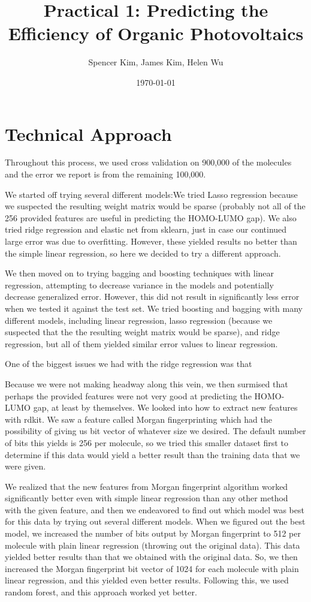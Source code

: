 \documentclass[11pt]{article}
\title{Practical 1: Predicting the Efficiency of Organic Photovoltaics}
\author{Spencer Kim, James Kim, Helen Wu}
\date{\today}
\begin{document}
\maketitle
\section{Technical Approach}
Throughout this process, we used cross validation on 900,000 of the molecules and the error we report is from the remaining 100,000.

We started off trying several different models:We tried Lasso regression because we suspected the resulting weight matrix would be sparse (probably not all of the 256 provided features are useful in predicting the HOMO-LUMO gap). We also tried ridge regression and elastic net from sklearn, just in case our continued large error was due to overfitting. However, these yielded results no better than the simple linear regression, so here we decided to try a different approach.

We then moved on to trying bagging and boosting techniques with linear regression, attempting to decrease variance in the models and potentially decrease generalized error. However, this did not result in significantly less error when we tested it against the test set. We tried boosting and bagging with many different models, including linear regression, lasso regression (because we suspected that the the resulting weight matrix would be sparse), and ridge regression, but all of them yielded similar error values to linear regression.

One of the biggest issues we had with the ridge regression was that 

Because we were not making headway along this vein, we then surmised that perhaps the provided features were not very good at predicting the HOMO-LUMO gap, at least by themselves. We looked into how to extract new features with rdkit. We saw a feature called Morgan fingerprinting which had the possibility of giving us bit vector of whatever size we desired. The default number of bits this yields is 256 per molecule, so we tried this smaller dataset first to determine if this data would yield a better result than the training data that we were given. 

We realized that the new features from Morgan fingerprint algorithm worked significantly better even with simple linear regression than any other method with the given feature, and then we endeavored to find out which model was best for this data by trying out several different models. When we figured out the best model, we increased the number of bits output by Morgan fingerprint to 512 per molecule with plain linear regression (throwing out the original data). This data yielded better results than that we obtained with the original data. So, we then increased the Morgan fingerprint bit vector of 1024 for each molecule with plain linear regression, and this yielded even better results. Following this, we used random forest, and this approach worked yet better.
\end{document}
